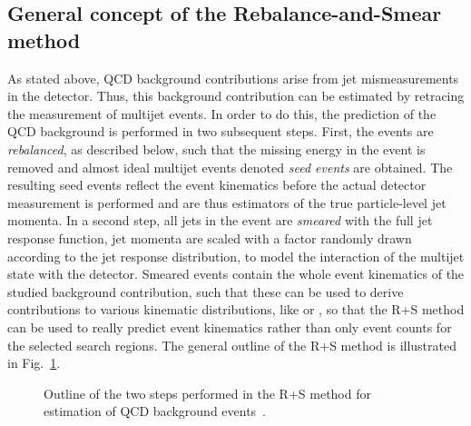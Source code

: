 \subsection{General concept of the Rebalance-and-Smear method}
\label{subsec:RPlusS_concept} 
As stated above, QCD background contributions arise from jet mismeasurements in the detector. Thus, this background contribution can be estimated by retracing the measurement of multijet events. In order to do this, the prediction of the QCD background is performed in two subsequent steps. First, the events are \textit{rebalanced}, as described below, such that the missing energy in the event is removed and almost ideal multijet events denoted \textit{seed events} are obtained. The resulting seed events reflect the event kinematics before the actual detector measurement is performed and are thus estimators of the true particle-level jet momenta. In a second step, all jets in the event are \textit{smeared} with the full jet response function, \ie jet momenta are scaled with a factor randomly drawn according to the jet response distribution, to model the interaction of the multijet state with the detector. Smeared events contain the whole event kinematics of the studied background contribution, such that these can be used to derive contributions to various kinematic distributions, like \HT or \MHT, so that the R+S method can be used to really predict event kinematics rather than only event counts for the selected search regions. The general outline of the R+S method is illustrated in Fig.~\ref{fig:RPlusS_concept}.
\begin{figure}[!t]
  \centering
  \caption{Outline of the two steps performed in the R+S method for estimation of QCD background events~\cite{MSchrode}.}
  \label{fig:RPlusS_concept}
\end{figure}
